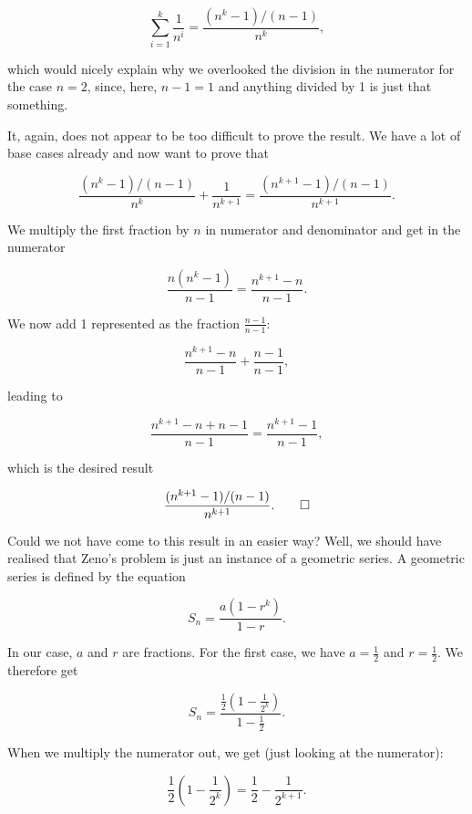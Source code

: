 \documentclass[tikz]{scrreprt}
\begin{document}
\begin{equation}
\sum_{i=1}^k{\frac{1}{n^i}} =
\frac{(n^k - 1) / (n-1)}{n^k},
\end{equation}

which would nicely explain why we overlooked
the division in the numerator for the case $n=2$,
since, here, $n-1 = 1$ and anything
divided by 1 is just that something.

It, again, does not appear to be too difficult to prove
the result.
We have a lot of base cases already
and now want to prove that

\begin{equation}
\frac{(n^k - 1) / (n-1)}{n^k} + \frac{1}{n^{k+1}} =
\frac{(n^{k+1} - 1) / (n-1)}{n^{k+1}}.
\end{equation}

We multiply the first fraction by $n$
in numerator and denominator and get 
in the numerator

\[
\frac{n(n^k - 1)}{n-1} = 
\frac{n^{k+1} - n}{n-1}.
\]

We now add 1 represented as the fraction $\frac{n-1}{n-1}$:

\[
\frac{n^{k+1} - n}{n-1} + \frac{n-1}{n-1},
\]

leading to 

\[
\frac{n^{k+1} - n + n - 1}{n-1} =
\frac{n^{k+1} - 1}{n-1},
\]

which is the desired result 

\[
\frac{(n^{k+1} - 1)/(n-1)}{n^{k+1}}.\qed
\]

Could we not have come 
to this result in an easier way?
Well, we should have realised that
Zeno's problem is just an instance of
a geometric series. A geometric series
is defined by the equation

\begin{equation}
S_n = \frac{a(1-r^k)}{1-r}.
\end{equation}

In our case, $a$ and $r$ are fractions. For the first case,
we have $a=\frac{1}{2}$ and $r=\frac{1}{2}$.
We therefore get

\begin{equation}
S_n = \frac{\frac{1}{2}(1-\frac{1}{2^k})}{1-\frac{1}{2}}.
\end{equation}

When we multiply the numerator out,
we get (just looking at the numerator):

\[
\frac{1}{2}\left(1-\frac{1}{2^k}\right) = 
\frac{1}{2}-\frac{1}{2^{k+1}}.
\]
\end{document}
